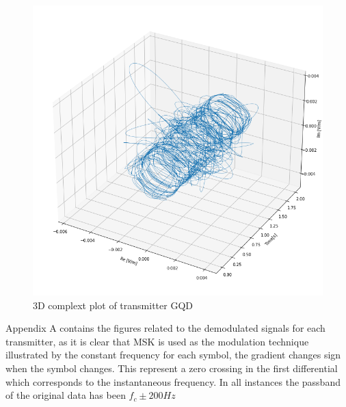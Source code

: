 \begin{figure}[h!]
    \centering
    \includegraphics[width = \textwidth]{figs/sig_character/gqd3D.png}
    \caption{3D complext plot of transmitter GQD}
    \label{fig:gqd3d}
\end{figure}


Appendix A contains the figures related to the demodulated signals for each transmitter, as it is clear that MSK is used as the modulation technique illustrated by the constant frequency for each symbol, the gradient changes sign when the symbol changes. This represent a zero crossing in the first differential which corresponds to the instantaneous frequency. In all instances the passband of the original data has been $f_c \pm 200Hz$

